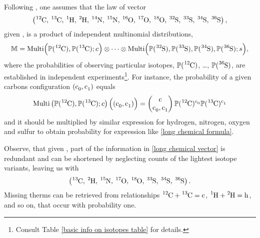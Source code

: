 Following \cite{Kienitz1961MassSpectrometry}, one assumes that the law of vector
\begin{equation}\label{long chemical vector}
	\left( \cem{^{12}C},\, \cem{^{13}C},\, \cem{^{1}H},\, \cem{^{2}H},\, \cem{^{14}N},\, \cem{^{15}N},\, \cem{^{16}O},\, \cem{^{17}O},\, \cem{^{18}O},\, \cem{^{32}S},\, \cem{^{33}S},\, \cem{^{34}S},\, \cem{^{36}S} \right),	
\end{equation}
given \molecule, is a product of independent multinomial distributions,
{\small\begin{equation}\label{product of multinomials}
	\MM = \mathrm{Multi} \Big( \prob(\cem{^{12}C}), \prob(\cem{^{13}C}); c \Big)
	\otimes \dots \otimes 
	\mathrm{Multi} \Big( \prob(\cem{^{32}S}), \prob(\cem{^{33}S}), \prob(\cem{^{34}S}), \prob(\cem{^{36}S}); s \Big),	
\end{equation}}
where the probabilities of observing particular isotopes, $\prob(\cem{^{12}C})$, \dots, $\prob(\cem{^{36}S})$, are established in independent experiments\footnote{Consult Table \ref{basic info on isotopes table} for details.}. For instance, the probability of a given carbons configuration $(\cem{c_0}, \cem{c_1})$ equals
$$
	\mathrm{Multi} \left( \prob(\cem{^{12}C}), \prob(\cem{^{13}C}); c \right)
		\Big( (\cem{c_0}, \cem{c_1}) \Big) = 
	\begin{pmatrix}
		\cem{c} \cr \cem{c_0}, \cem{c_1}  
	\end{pmatrix} \prob(\cem{^{12}C})^\cem{c_0} \prob(\cem{^{13}C})^\cem{c_1}
$$
and it should be multiplied by similar expression for hydrogen, nitrogen, oxygen and sulfur to obtain probability for expression like \eqref{long chemical formula}.


Observe, that given \molecule, part of the information in \eqref{long chemical vector} is redundant and can be shortened by neglecting counts of the lightest isotope variants, leaving us with 
\begin{equation}\label{short chemical vector}
 	\left( \cem{^{13}C},\, \cem{^{2}H},\, \cem{^{15}N},\, \cem{^{17}O},\, \cem{^{18}O},\, \cem{^{33}S},\, \cem{^{34}S},\, \cem{^{36}S} \right).	
\end{equation}
Missing therms can be retrieved from relationships $\cem{^{12}C} + \cem{^{13}C} = \cem{c}$, $\cem{^{1}H} + \cem{^{2}H} = \cem{h}$, and so on, that occur with probability one.

